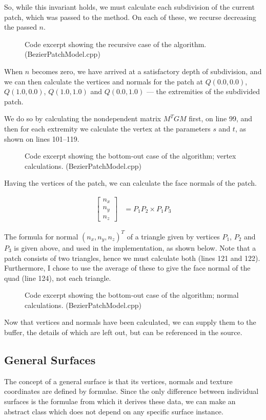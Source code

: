 \documentclass[11pt]{article}
\newcommand{\codefig}[5]
{
\begin{figure}[H]
    
    \caption{Code excerpt #5 (#2)}
    \label{code:#1}
\end{figure}
}
\begin{document}
So, while this invariant holds, we must calculate each subdivision of the
current patch, which was passed to the method. On each of these, we recurse
decreasing the passed $n$.
\codefig{bezier-patch-subd|part:3}{BezierPatchModel.cpp}{142}{152}
{showing the recursive case of the algorithm.}

When $n$ becomes zero, we have arrived at a satisfactory depth of subdivision,
and we can then calculate the vertices and normals for the patch at
$Q(0.0,0.0)$, $Q(1.0,0.0)$, $Q(1.0,1.0)$ and $Q(0.0,1.0)$ --- the extremities
of the subdivided patch.

We do so by calculating the nondependent matrix $M^TGM$ first, on line 99, and
then for each extremity we calculate the vertex at the parameters $s$ and $t$,
as shown on lines 101--119.
\codefig{bezier-patch-subd|part:1}{BezierPatchModel.cpp}{99}{119}
{showing the bottom-out case of the algorithm; vertex calculations.}

Having the vertices of the patch, we can calculate the face normals of the
patch.

\begin{align}
    \begin{bmatrix}
        n_x \\ n_y \\ n_z
    \end{bmatrix}
    &= P_1P_2 \times P_1P_3
\end{align}

The formula for normal $(n_x, n_y, n_z)^T$ of a triangle given by vertices
$P_1$, $P_2$ and $P_3$ is given above, and used in the implementation, as
shown below. Note that a patch consists of two triangles, hence we must
calculate both (lines 121 and 122). Furthermore, I chose to use the average of
these to give the face normal of the quad (line 124), not each triangle.
\codefig{bezier-patch-subd|part:2}{BezierPatchModel.cpp}{121}{124}
{showing the bottom-out case of the algorithm; normal calculations.}

Now that vertices and normals have been calculated, we can supply them to the
buffer, the details of which are left out, but can be referenced in the
source.

\subsection{General Surfaces}
The concept of a general surface is that its vertices, normals and texture
coordinates are defined by formulae. Since the only difference between
individual surfaces is the formulae from which it derives these data, we can
make an abstract class which does not depend on any specific surface instance.
\end{document}
